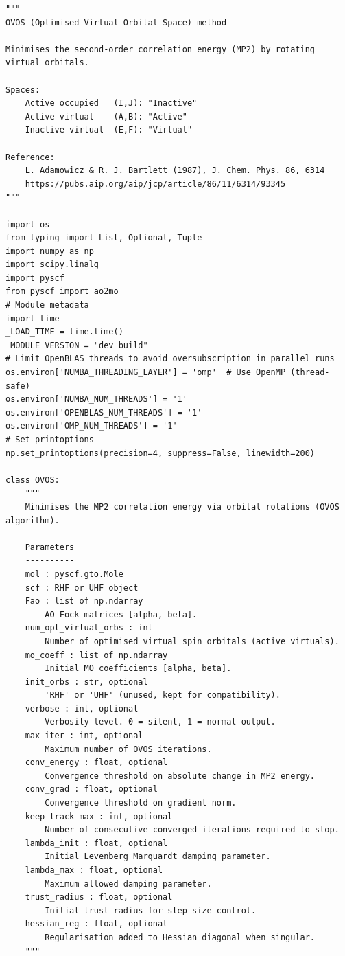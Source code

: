 \begin{lstlisting}[style=python, caption={...}, label=lst:full_code]
"""
OVOS (Optimised Virtual Orbital Space) method

Minimises the second-order correlation energy (MP2) by rotating virtual orbitals.

Spaces:
    Active occupied   (I,J): "Inactive"
    Active virtual    (A,B): "Active"
    Inactive virtual  (E,F): "Virtual"

Reference:
    L. Adamowicz & R. J. Bartlett (1987), J. Chem. Phys. 86, 6314
    https://pubs.aip.org/aip/jcp/article/86/11/6314/93345
"""

import os
from typing import List, Optional, Tuple
import numpy as np
import scipy.linalg
import pyscf
from pyscf import ao2mo
# Module metadata
import time
_LOAD_TIME = time.time()
_MODULE_VERSION = "dev_build"
# Limit OpenBLAS threads to avoid oversubscription in parallel runs
os.environ['NUMBA_THREADING_LAYER'] = 'omp'  # Use OpenMP (thread-safe)
os.environ['NUMBA_NUM_THREADS'] = '1'
os.environ['OPENBLAS_NUM_THREADS'] = '1'
os.environ['OMP_NUM_THREADS'] = '1'
# Set printoptions
np.set_printoptions(precision=4, suppress=False, linewidth=200)

class OVOS:
    """
    Minimises the MP2 correlation energy via orbital rotations (OVOS algorithm).

    Parameters
    ----------
    mol : pyscf.gto.Mole
    scf : RHF or UHF object
    Fao : list of np.ndarray
        AO Fock matrices [alpha, beta].
    num_opt_virtual_orbs : int
        Number of optimised virtual spin orbitals (active virtuals).
    mo_coeff : list of np.ndarray
        Initial MO coefficients [alpha, beta].
    init_orbs : str, optional
        'RHF' or 'UHF' (unused, kept for compatibility).
    verbose : int, optional
        Verbosity level. 0 = silent, 1 = normal output.
    max_iter : int, optional
        Maximum number of OVOS iterations.
    conv_energy : float, optional
        Convergence threshold on absolute change in MP2 energy.
    conv_grad : float, optional
        Convergence threshold on gradient norm.
    keep_track_max : int, optional
        Number of consecutive converged iterations required to stop.
    lambda_init : float, optional
        Initial Levenberg Marquardt damping parameter.
    lambda_max : float, optional
        Maximum allowed damping parameter.
    trust_radius : float, optional
        Initial trust radius for step size control.
    hessian_reg : float, optional
        Regularisation added to Hessian diagonal when singular.
    """


\end{lstlisting}
